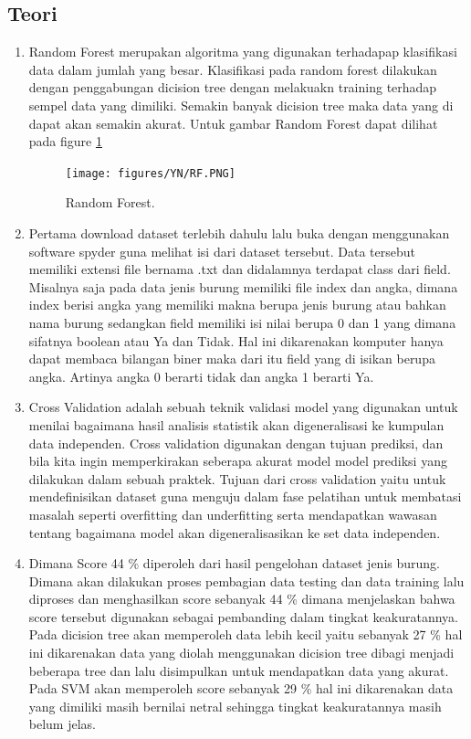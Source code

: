 \subsection{Teori}
\begin{enumerate}

\item Random Forest merupakan algoritma yang digunakan terhadapap klasifikasi data dalam jumlah yang besar. Klasifikasi pada random forest dilakukan dengan penggabungan dicision tree dengan melakuakn training terhadap sempel data yang dimiliki. Semakin banyak dicision tree maka data yang di dapat akan semakin akurat. Untuk gambar Random Forest dapat dilihat pada figure \ref{YNRF}

	\begin{figure}[ht]
	\centerline{\texttt{[image: figures/YN/RF.PNG]}}
	\caption{Random Forest.}
	\label{YNRF}
	\end{figure}

\item Pertama download dataset terlebih dahulu lalu buka dengan menggunakan software spyder guna melihat isi dari dataset tersebut. Data tersebut memiliki extensi file bernama .txt dan didalamnya terdapat class dari field. Misalnya saja pada data jenis burung memiliki file index dan angka, dimana index berisi angka yang memiliki makna berupa jenis burung atau bahkan nama burung sedangkan field memiliki isi nilai berupa 0 dan 1 yang dimana sifatnya boolean atau Ya dan Tidak. Hal ini dikarenakan komputer hanya dapat membaca bilangan biner maka dari itu field yang di isikan berupa angka. Artinya angka 0 berarti tidak dan angka 1 berarti Ya.

\item Cross Validation adalah sebuah teknik validasi model yang digunakan untuk menilai bagaimana hasil analisis statistik akan digeneralisasi ke kumpulan data independen. Cross validation digunakan dengan tujuan prediksi, dan bila kita ingin memperkirakan seberapa akurat model model prediksi yang dilakukan dalam sebuah praktek. Tujuan dari cross validation yaitu untuk mendefinisikan dataset guna menguju dalam fase pelatihan untuk membatasi masalah seperti overfitting dan underfitting serta mendapatkan wawasan tentang bagaimana model akan digeneralisasikan ke set data independen.

\item Dimana Score 44 \% diperoleh dari hasil pengelohan dataset jenis burung. Dimana akan dilakukan proses pembagian data testing dan data training lalu diproses dan menghasilkan score sebanyak 44 \% dimana menjelaskan bahwa score tersebut digunakan sebagai pembanding dalam tingkat keakuratannya. Pada dicision tree akan memperoleh data lebih kecil yaitu sebanyak 27 \% hal ini dikarenakan data yang diolah menggunakan dicision tree dibagi menjadi beberapa tree dan lalu disimpulkan untuk mendapatkan data yang akurat. Pada SVM akan memperoleh score sebanyak 29 \% hal ini dikarenakan data yang dimiliki masih bernilai netral sehingga tingkat keakuratannya masih belum jelas.


\end{enumerate}
